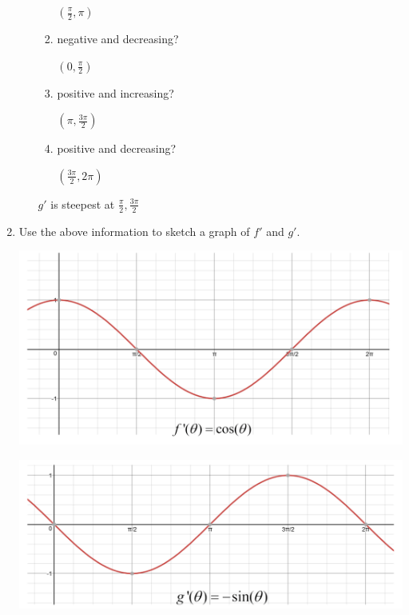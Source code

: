 \documentclass[nooutcomes]{ximera}
\begin{document}
\begin{problem}
\begin{enumerate}
\begin{enumerate}
\begin{enumerate}
				\begin{freeResponse}
					$(\frac{\pi}{2},\pi)$
				\end{freeResponse}
			\item negative and decreasing?
				\begin{freeResponse}
					$(0,\frac{\pi}{2})$
				\end{freeResponse}
			\item positive and increasing?
				\begin{freeResponse}
					$(\pi,\frac{3\pi}{2})$
				\end{freeResponse}
			\item positive and decreasing?
				\begin{freeResponse}
					$(\frac{3\pi}{2},2\pi)$
				\end{freeResponse}
			\end{enumerate}
		\begin{freeResponse}
			$g'$ is steepest at $\frac{\pi}{2},\frac{3\pi}{2}$
		\end{freeResponse}
		\end{enumerate}
	\item Use the above information to sketch a graph of $f'$ and $g'$.
		\begin{freeResponse} \hfil
		\begin{image}
		\includegraphics[scale=.3]{figure10.png}
		\end{image}
		\begin{image}
		\includegraphics[scale=.3]{figure11.png}
		\end{image}
		\end{freeResponse}


\end{enumerate}
\end{problem}
\end{document}
